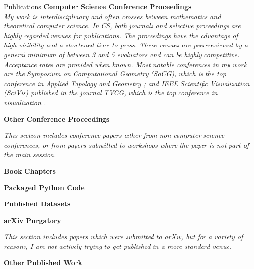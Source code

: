 \documentclass{resume} %
\begin{document}
\begin{rSection}{Publications}
\textbf{Computer Science Conference Proceedings}\\
\textit{My work is interdisciplinary and often crosses between mathematics and theoretical computer science.
In CS, both journals and selective proceedings are highly regarded venues for publications.
The proceedings have the advantage of high visibility and a shortened time to press. These venues are peer-reviewed by a general minimum of between 3 and 5 evaluators and can be highly competitive. Acceptance rates are provided when known. Most notable conferences in my work are the \emph{Symposium on Computational Geometry (SoCG)}, which is the top conference in Applied Topology and Geometry \cite{Chambers2020,Munch2016,Bauer2015b}; and IEEE Scientific Visualization (SciVis) published in the journal TVCG, which is the top conference in visualization \cite{Yan2019a}.}
\printbibliography[keyword = conferenceTop, heading=none]


\textbf{Other Conference Proceedings}

\textit{This section includes conference papers either from non-computer science conferences, or from papers submitted to workshops where the paper is not part of the main session.}

\printbibliography[keyword = conference, heading=none]

\textbf{Book Chapters}
\printbibliography[keyword = book, heading=none]

\textbf{Packaged Python Code}
\printbibliography[keyword = code, heading=none]


\textbf{Published Datasets}
\printbibliography[keyword = dataset, heading=none]

\textbf{arXiv Purgatory}

\textit{This section includes papers which were submitted to arXiv, but for a variety of reasons, I am not actively trying to get published in a more standard venue. }
\printbibliography[keyword = purgatory, heading=none]

\textbf{Other Published Work}
\printbibliography[keyword = other, heading=none]


%
% 
% 

%
\end{rSection}
\end{document}
